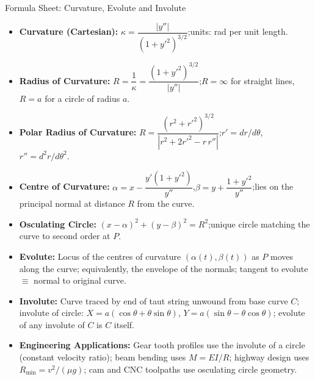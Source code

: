 \documentclass[12pt,a4paper]{article}
\begin{document}
\begin{learnbox}{Formula Sheet: Curvature, Evolute and Involute}
\begin{itemize}[nosep, leftmargin=*]
  \item \textbf{Curvature (Cartesian):} $\kappa = \dfrac{|y''|}{(1+y'^{2})^{3/2}}$;\quad units: rad per unit length.
  \item \textbf{Radius of Curvature:} $R = \dfrac{1}{\kappa} = \dfrac{(1+y'^{2})^{3/2}}{|y''|}$;\quad $R=\infty$ for straight lines, $R=a$ for a circle of radius $a$.
  \item \textbf{Polar Radius of Curvature:} $R = \dfrac{(r^{2}+r'^{2})^{3/2}}{|r^{2}+2r'^{2}-r\,r''|}$;\quad $r' = dr/d\theta$,\; $r'' = d^{2}r/d\theta^{2}$.
  \item \textbf{Centre of Curvature:} $\alpha = x - \dfrac{y'(1+y'^{2})}{y''}$,\quad $\beta = y + \dfrac{1+y'^{2}}{y''}$;\quad lies on the principal normal at distance $R$ from the curve.
  \item \textbf{Osculating Circle:} $(x-\alpha)^{2}+(y-\beta)^{2}=R^{2}$;\quad unique circle matching the curve to second order at $P$.
  \item \textbf{Evolute:} Locus of the centres of curvature $(\alpha(t), \beta(t))$ as $P$ moves along the curve; equivalently, the envelope of the normals; tangent to evolute $\equiv$ normal to original curve.
  \item \textbf{Involute:} Curve traced by end of taut string unwound from base curve $C$; involute of circle: $X=a(\cos\theta+\theta\sin\theta)$, $Y=a(\sin\theta-\theta\cos\theta)$; evolute of any involute of $C$ is $C$ itself.
  \item \textbf{Engineering Applications:} Gear tooth profiles use the involute of a circle (constant velocity ratio); beam bending uses $M = EI/R$; highway design uses $R_{\min} = v^{2}/(\mu g)$; cam and CNC toolpaths use osculating circle geometry.
\end{itemize}
\end{learnbox}
\end{document}

